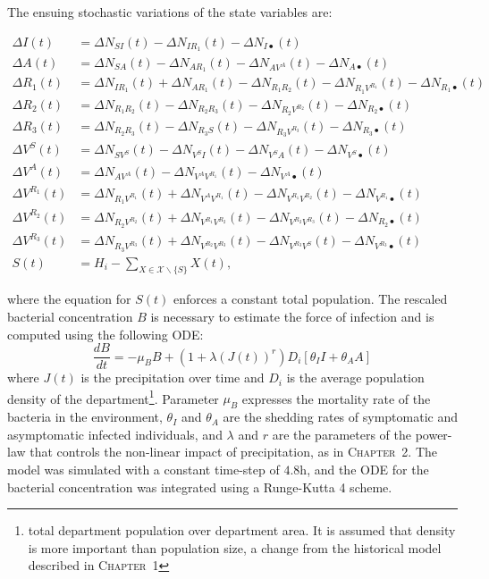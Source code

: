 The ensuing stochastic variations of the state variables are:
\begin{fullwidth}
\begingroup
\allowdisplaybreaks
\label{eq:stochstates}
\begin{align}
    \Delta I(t) &= \Delta N_{SI}(t) -  \Delta N_{IR_1}(t) -  \Delta N_{I\bullet}(t)\\
    \Delta A(t) &= \Delta N_{SA}(t) -  \Delta N_{AR_1}(t) -  \Delta N_{AV^A}(t) - \Delta N_{A\bullet}(t)\\
    \Delta R_1(t) &= \Delta N_{IR_1}(t) + \Delta N_{AR_1}(t) -  \Delta N_{R_1 R_2}(t) -  \Delta N_{R_1V^{R_1}}(t) -  \Delta N_{R_1\bullet}(t)\\
    \Delta R_2(t) &= \Delta N_{R_1R_2}(t) - \Delta N_{R_2 R_3}(t) -  \Delta N_{R_2V^{R_2}}(t) -  \Delta N_{R_2\bullet}(t)\\
    \Delta R_3(t) &= \Delta N_{R_2R_3}(t) - \Delta N_{R_3 S}(t) -  \Delta N_{R_3V^{R_3}}(t) -  \Delta N_{R_3\bullet}(t)\\
    \Delta V^S(t) &= \Delta N_{SV^S}(t) -  \Delta N_{V^S I}(t)-  \Delta N_{V^S A}(t) - \Delta N_{V^S\bullet}(t)\\
    \Delta V^A(t) &= \Delta N_{AV^A}(t) -  \Delta N_{V^AV^{R_1}}(t) - \Delta N_{V^A\bullet}(t)\\
    \Delta V^{R_1}(t) &= \Delta N_{R_1V^{R_1}}(t) +  \Delta N_{V^AV^{R_1}}(t) - \Delta N_{V^{R_1}V^{R_2}}(t) - \Delta N_{V^{R_1}\bullet}(t)\\
    \Delta V^{R_2}(t) &=\Delta N_{R_2V^{R_2}}(t)+\Delta N_{V^{R_1} V^{R_2}}(t) -  \Delta N_{V^{R_2}V^{R_3}}(t) -  \Delta N_{R_2\bullet}(t)\\
    \Delta V^{R_3}(t) &= \Delta N_{R_3V^{R_3}}(t)+\Delta N_{V^{R_2}V^{R_3}}(t) - \Delta N_{V^{R_3}V^ S}(t) - \Delta N_{V^{R_3}\bullet}(t)\\
    S(t) &= H_i - \sum_{X \in \mathcal{X} \backslash \{S\}} X(t),
\end{align}
\endgroup
\end{fullwidth}
where the equation for $S(t)$ enforces a constant total population. 
The rescaled bacterial concentration $B$ is necessary to estimate the force of infection and is computed using the following ODE:
\begin{equation}
\frac{dB}{dt} = - \mu_B B +  \left(1 + \lambda\left( J(t)\right)^{r} \right)  D_i \left[\theta_I I + \theta_A A\right] 
\end{equation}
where $J(t)$ is the precipitation over time and $D_i$ is the average population density of the department\footnote{total department population over department area. It is assumed that density is more important than population size, a change from the historical model described in \textsc{Chapter~1}}.  Parameter $\mu_B$ expresses the mortality rate of the bacteria in the environment, $\theta_I$ and $\theta_A$ are the shedding rates of symptomatic and asymptomatic infected individuals, and $\lambda$ and $r$ are the parameters of the power-law that controls the non-linear impact of precipitation, as in \textsc{Chapter~2}. The model was simulated with a constant time-step of $4.8$h, and the ODE for the bacterial concentration was integrated using a Runge-Kutta 4 scheme.



